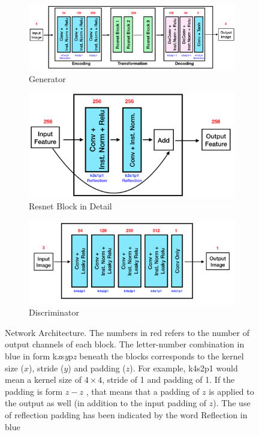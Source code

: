 \documentclass[10pt,twocolumn,letterpaper]{article}
\begin{document}
\begin{figure}[!htb]
     \centering
     
     \begin{subfigure}[b]{\textwidth}
         \centering
         \includegraphics[width=\textwidth]{generator}
         \caption{Generator}
         \label{fig:gen}
     \end{subfigure}
     \vfill
     \begin{subfigure}[b]{0.6\textwidth}
         \centering
         \includegraphics[width=\textwidth]{res_block}
         \caption{Resnet Block in Detail}
         \label{fig:res}
     \end{subfigure}
     \vfill
     \begin{subfigure}[b]{0.8\textwidth}
         \centering
         \includegraphics[width=\textwidth]{discriminator}
         \caption{Discriminator}
         \label{fig:disc}
     \end{subfigure}
        \caption{Network Architecture. The numbers in red refers to the number of output channels of each block. The letter-number combination in blue in form k\textit{x}s\textit{y}p\textit{z} beneath the blocks corresponds to the kernel size ($x$), stride ($y$) and padding ($z$). For example, k4s2p1 would mean a kernel size of $4 \times 4$, stride of 1 and padding of 1. If the padding is form $z-z$ , that means that a padding of $z$ is applied to the output as well (in addition to the input padding of $z$). The use of reflection padding has been indicated by the word Reflection in blue}
        \label{fig:architecture}
\end{figure} 
\end{document}
